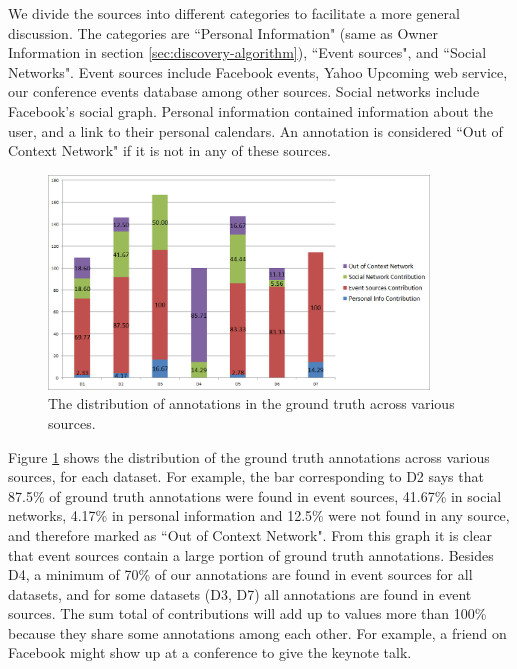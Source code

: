 We divide the sources into different categories to facilitate a more general discussion. The categories are ``Personal Information" (same as Owner Information in section \ref{sec:discovery-algorithm}), ``Event sources", and ``Social Networks". Event sources include Facebook events, Yahoo Upcoming web service, our conference events database among other sources. Social networks include Facebook's social graph. Personal information contained information about the user, and a link to their personal calendars. An annotation is considered ``Out of Context Network" if it is not in any of these sources.

\begin{figure}[t]
\centering
\includegraphics[width=0.9\textwidth]{media/gt-distro-stacked-2.png}
\caption{The distribution of annotations in the ground truth across various sources.}
\label{fig:src-cand-distribution}
\end{figure}

Figure \ref{fig:src-cand-distribution} shows the distribution of the ground truth annotations across various sources, for each dataset. For example, the bar corresponding to D2 says that 87.5\% of ground truth annotations were found in event sources, 41.67\% in social networks, 4.17\% in personal information and 12.5\% were not found in any source, and therefore marked as ``Out of Context Network". From this graph it is clear that event sources contain a large portion of ground truth annotations. Besides D4, a minimum of 70\% of our annotations are found in event sources for all datasets, and for some datasets (D3, D7) all annotations are found in event sources. The sum total of contributions will add up to values more than 100\% because they share some annotations among each other. For example, a friend on Facebook might show up at a conference to give the keynote talk.

